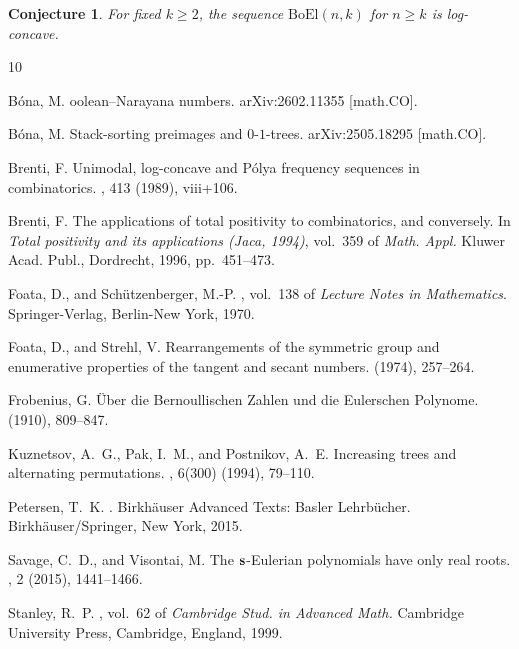 \documentclass[10pt]{article}
\theoremstyle{plain}
\newtheorem{conjecture}[theorem]{Conjecture}
\newcommand{\boel}{\mathrm{BoEl}}
\begin{document}
\begin{conjecture}
\label{conj:vertical}
For fixed $k \geq 2$, the sequence $\boel(n,k)$ for $n \geq k$ is log-concave.
\end{conjecture}

%
%
%
%
%

%
%

\begin{thebibliography}{10}

{\sc B\'{o}na, M.}
oolean--{N}arayana numbers.
\newblock arXiv:2602.11355 [math.CO].

{\sc B\'{o}na, M.}
\newblock Stack-sorting preimages and $0$-$1$-trees.
\newblock arXiv:2505.18295 [math.CO].

{\sc Brenti, F.}
\newblock Unimodal, log-concave and {P}\'olya frequency sequences in
  combinatorics.
, 413 (1989), viii+106.

{\sc Brenti, F.}
\newblock The applications of total positivity to combinatorics, and
  conversely.
\newblock In {\em Total positivity and its applications ({J}aca, 1994)},
  vol.~359 of {\em Math. Appl.} Kluwer Acad. Publ., Dordrecht, 1996,
  pp.~451--473.

{\sc Foata, D., and Sch\"utzenberger, M.-P.}
,
  vol.~138 of {\em Lecture Notes in Mathematics}.
\newblock Springer-Verlag, Berlin-New York, 1970.

{\sc Foata, D., and Strehl, V.}
\newblock Rearrangements of the symmetric group and enumerative properties of
  the tangent and secant numbers.
 (1974), 257--264.

{\sc Frobenius, G.}
\newblock \"{U}ber die {Bernoullischen} {Zahlen} und die {Eulerschen}
  {Polynome}.
 (1910), 809--847.

{\sc Kuznetsov, A.~G., Pak, I.~M., and Postnikov, A.~E.}
\newblock Increasing trees and alternating permutations.
, 6(300) (1994), 79--110.

{\sc Petersen, T.~K.}
.
\newblock Birkh\"auser Advanced Texts: Basler Lehrb\"ucher.
  Birkh\"auser/Springer, New York, 2015.

{\sc Savage, C.~D., and Visontai, M.}
\newblock The {$\bold{s}$}-{E}ulerian polynomials have only real roots.
, 2 (2015), 1441--1466.

{\sc Stanley, R.~P.}
, vol.~62 of {\em Cambridge
  Stud. in Advanced Math.}
\newblock Cambridge University Press, Cambridge, England, 1999.

\end{thebibliography}

%
%
%
%
%
\end{document}
